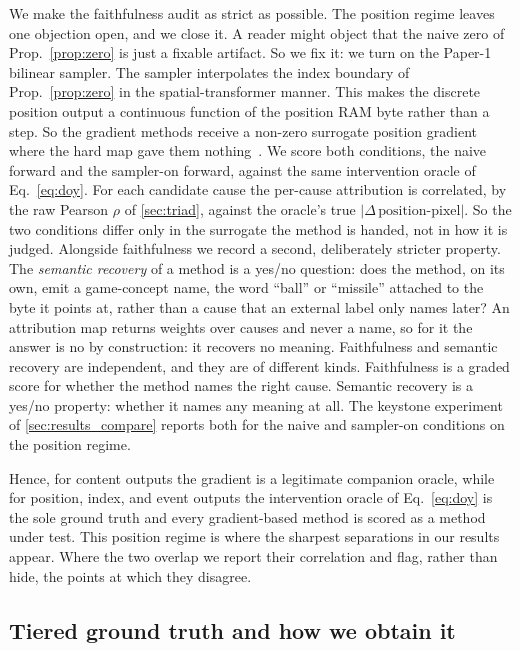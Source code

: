 We make the faithfulness audit as strict as possible. The position regime leaves one
objection open, and we close it. A reader might object that the naive zero of
Prop.~\ref{prop:zero} is just a fixable artifact. So we fix it: we turn on the Paper-1
bilinear sampler. The sampler interpolates the index boundary of Prop.~\ref{prop:zero} in the
spatial-transformer manner. This makes the discrete position output a continuous function of
the position RAM byte rather than a step. So the gradient methods receive a non-zero surrogate
position gradient where the hard map gave them nothing~\cite{jaderberg2015spatial}. We score
both conditions, the naive forward and the sampler-on forward, against the same intervention
oracle of Eq.~\eqref{eq:doy}. For each candidate cause the per-cause attribution is
correlated, by the raw Pearson $\rho$ of \Sectionname\ref{sec:triad}, against the oracle's true
$|\Delta\,\text{position-pixel}|$. So the two conditions differ only in the surrogate the
method is handed, not in how it is judged.
Alongside faithfulness we record a second, deliberately stricter property. The
\emph{semantic recovery} of a method is a yes/no question: does the method, on its own, emit a
game-concept name, the word ``ball'' or ``missile'' attached to the byte it points at,
rather than a cause that an external label only names later? An attribution map returns weights
over causes and never a name, so for it the answer is no by construction: it recovers no meaning.
Faithfulness and semantic recovery are independent, and they are of different kinds. Faithfulness
is a graded score for whether the method names the right cause. Semantic recovery is a yes/no
property: whether it names any meaning at all. The keystone experiment of
\Sectionname\ref{sec:results_compare} reports both for the naive and sampler-on conditions on the
position regime.

Hence, for content outputs the gradient is a legitimate companion oracle, while for position,
index, and event outputs the intervention oracle of Eq.~\eqref{eq:doy} is the sole ground
truth and every gradient-based method is scored as a method under test. This position regime
is where the sharpest separations in our results appear. Where the two overlap we report their
correlation and flag, rather than hide, the points at which they disagree.

\subsection{Tiered ground truth and how we obtain it}\label{sec:tiers}

